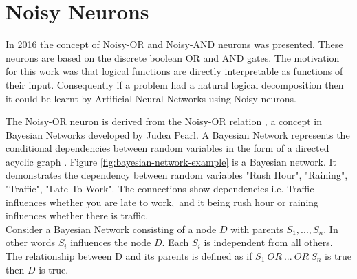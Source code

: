 \section{Noisy Neurons} \label{sec:background-noisy-neurons}
In 2016 the concept of Noisy-OR and Noisy-AND neurons \cite{LearningLogicalActivations} was presented. These neurons are based on the discrete boolean OR and AND gates. The motivation for this work was that logical functions are directly interpretable as functions of their input. Consequently if a problem had a natural logical decomposition then it could be learnt by Artificial Neural Networks using Noisy neurons.

\noindent
\begin{minipage}[t]{0.6\textwidth}
\vspace{0px}
The Noisy-OR neuron is derived from the Noisy-OR relation \cite{russell1995modern}, a concept in Bayesian Networks developed by Judea Pearl. A Bayesian Network represents the conditional dependencies between random variables in the form of a directed acyclic graph \cite{neapolitan2004learning}. Figure \ref{fig:bayesian-network-example} is a Bayesian network. It demonstrates the dependency between random variables "Rush Hour", "Raining", "Traffic", "Late To Work". The connections show dependencies i.e. Traffic influences whether you are late to work,\ and it being rush hour or raining influences whether there is traffic.\\

Consider a Bayesian Network consisting of a node $D$ with parents $S_1,..., S_n$. In other words $S_i$ influences the node $D$. Each $S_i$ is independent from all others. The relationship between D and its parents is defined as if $S_1\ OR\ ...\ OR\ S_n$ is true then $D$ is true.
\end{minipage}
\hspace{0.05\textwidth}
